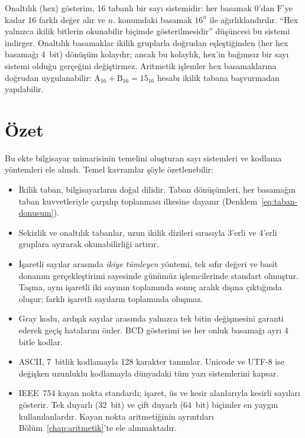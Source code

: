 Onaltılık (hex) gösterim, 16 tabanlı bir sayı sistemidir: her basamak $0$'dan $\text{F}$'ye kadar 16 farklı değer alır ve $n$. konumdaki basamak $16^n$ ile ağırlıklandırılır. ``Hex yalnızca ikilik bitlerin okunabilir biçimde gösterilmesidir'' düşüncesi bu sistemi indirger. Onaltılık basamaklar ikilik gruplarla doğrudan eşleştiğinden (her hex basamağı 4~bit) dönüşüm kolaydır; ancak bu kolaylık, hex'in bağımsız bir sayı sistemi olduğu gerçeğini değiştirmez. Aritmetik işlemler hex basamaklarına doğrudan uygulanabilir: $\text{A}_{16} + \text{B}_{16} = \text{15}_{16}$ hesabı ikilik tabana başvurmadan yapılabilir.

\section*{Özet}

Bu ekte bilgisayar mimarisinin temelini oluşturan sayı sistemleri ve kodlama yöntemleri ele alındı. Temel kavramlar şöyle özetlenebilir:

\begin{itemize}
\item İkilik taban, bilgisayarların doğal dilidir. Taban dönüşümleri, her basamağın taban kuvvetleriyle çarpılıp toplanması ilkesine dayanır (Denklem~\ref{eq:taban-donusum}).

\item Sekizlik ve onaltılık tabanlar, uzun ikilik dizileri sırasıyla 3'erli ve 4'erli gruplara ayırarak okunabilirliği artırır.

\item İşaretli sayılar arasında \emph{ikiye tümleyen} yöntemi, tek sıfır değeri ve basit donanım gerçekleştirimi sayesinde günümüz işlemcilerinde standart olmuştur. Taşma, aynı işaretli iki sayının toplamında sonuç aralık dışına çıktığında oluşur; farklı işaretli sayıların toplamında oluşmaz.

\item Gray kodu, ardışık sayılar arasında yalnızca tek bitin değişmesini garanti ederek geçiş hatalarını önler. BCD gösterimi ise her onluk basamağı ayrı 4 bitle kodlar.

\item ASCII, 7~bitlik kodlamayla 128 karakter tanımlar. Unicode ve UTF-8 ise değişken uzunluklu kodlamayla dünyadaki tüm yazı sistemlerini kapsar.

\item IEEE~754 kayan nokta standardı; işaret, üs ve kesir alanlarıyla kesirli sayıları gösterir. Tek duyarlı (32~bit) ve çift duyarlı (64~bit) biçimler en yaygın kullanılanlardır. Kayan nokta aritmetiğinin ayrıntıları Bölüm~\ref{chap:aritmetik}'te ele alınmaktadır.
\end{itemize}


